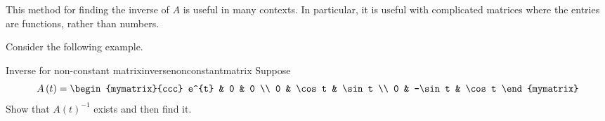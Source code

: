 %
%
%

This method for finding the inverse of $A$ is useful in many contexts. In particular, it 
is useful with complicated matrices where the entries are functions, rather than numbers.

Consider the following example. 

\begin{example}{Inverse for non-constant matrix}{inversenonconstantmatrix}
Suppose
\begin{equation*}
A\left( t\right) =\begin{mymatrix}{ccc}
e^{t} & 0 & 0 \\
0 & \cos t & \sin t \\
0 & -\sin t & \cos t
\end{mymatrix}
\end{equation*}
Show that $A\left( t\right) ^{-1}$ exists and then find it.
\end{example}

